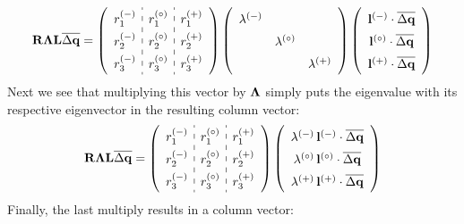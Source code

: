 \begin{equation}
\renewcommand{\arraystretch}{1.5}
\Rb\Lambdab \Lb \overline{\Delta \qb} =
   \left ( \begin{array}{c:c:c}
             r_1^\evm & r_1^\evz & r_1^\evp \\
             r_2^\evm & r_2^\evz & r_2^\evp \\
             r_3^\evm & r_3^\evz & r_3^\evp \end{array} \right )
   \left ( \begin{array}{ccc}
             \lambda^\evm &              & \\
                          & \lambda^\evz & \\
                          &              & \lambda^\evp \end{array} \right )
   \left ( \begin{array}{c}
            \lb^\evm \cdot \overline{\Delta \qb} \\
            \lb^\evz \cdot \overline{\Delta \qb} \\
            \lb^\evp \cdot \overline{\Delta \qb} \end{array} \right )
\renewcommand{\arraystretch}{1.0}
\end{equation}
Next we see that multiplying this vector by ${\boldsymbol{\Lambda}}$ simply puts the
eigenvalue with its respective eigenvector in the resulting column vector:
\begin{equation}
\renewcommand{\arraystretch}{1.5}
\Rb\Lambdab \Lb \overline{\Delta \qb} =
   \left ( \begin{array}{c:c:c}
             r_1^\evm & r_1^\evz & r_1^\evp \\
             r_2^\evm & r_2^\evz & r_2^\evp \\
             r_3^\evm & r_3^\evz & r_3^\evp \end{array} \right )
   \left ( \begin{array}{c}
            \lambda^\evm \, \lb^\evm \cdot \overline{\Delta \qb} \\
            \lambda^\evz \, \lb^\evz \cdot \overline{\Delta \qb} \\
            \lambda^\evp \, \lb^\evp \cdot \overline{\Delta \qb} \end{array} \right )
\renewcommand{\arraystretch}{1.0}
\end{equation}
Finally, the last multiply results in a column vector:
